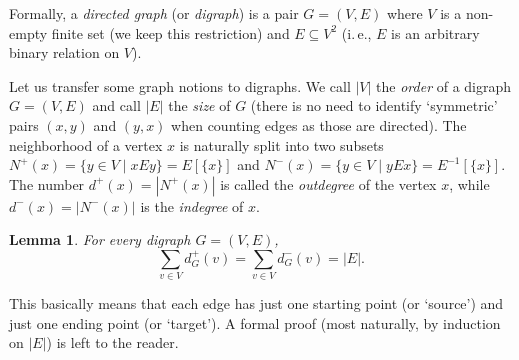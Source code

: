 \documentclass[12pt,notitlepage]{article}
\theoremstyle{plain}
\newtheorem{lemma}[thm]{Lemma}
\theoremstyle{definition}
\theoremstyle{plain}
\newcommand{\sbs}{\subseteq}
\newcommand{\1}{\mathbf{1}}
\newcommand{\0}{\mathbf{0}}
\begin{document}
Formally, a \emph{directed graph} (or \emph{digraph}) is a pair $G = (V, E)$ where $V$ is a non-empty finite set (we keep this restriction) and $E \sbs V^2$ (i.\,e., $E$ is an arbitrary binary relation on $V$).

Let us transfer some graph notions to digraphs. We call $|V|$ the \emph{order} of a digraph $G = (V, E)$ and call $|E|$ the \emph{size} of $G$ (there is no need to identify `symmetric' pairs $(x,y)$ and $(y,x)$ when counting edges as those are directed). The neighborhood of a vertex $x$ is naturally split into two subsets $N^+(x) = \{ y \in V \mid x E y \} = E[\{ x\}]$ and $N^-(x) = \{ y \in V \mid y E x \} = E^{-1}[\{x\}]$. The number $d^+(x) = |N^+(x)|$ is called the \emph{outdegree} of the vertex $x$, while $d^-(x) = |N^-(x)|$ is the \emph{indegree} of $x$.

\begin{lemma}
For every digraph $G = (V, E)$,
$$\sum_{v \in V} d^+_G(v) = \sum_{v \in V} d^-_G(v) = |E|.$$  
\end{lemma}
This basically means that each edge has just one starting point (or `source') and just one ending point (or `target'). A formal proof (most naturally, by induction on $|E|$) is left to the reader.

\end{document}

